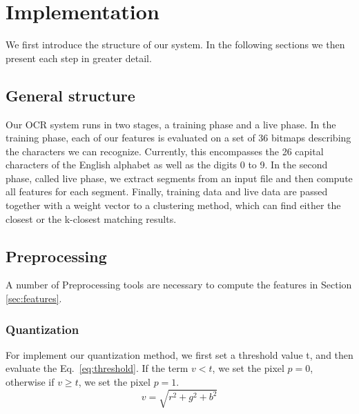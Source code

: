 \documentclass{article}
\begin{document}
\section{Implementation}
\label{sec:implementation}
We first introduce the structure of our system. In the following sections we then present each step in greater detail.

\subsection{General structure}
Our OCR system runs in two stages, a training phase and a live phase. In the training phase, each of our features is evaluated on a set of 36 bitmaps describing the characters we can recognize. Currently, this encompasses the 26 capital characters of the English alphabet as well as the digits 0 to 9. In the second phase, called live phase, we extract segments from an input file and then compute all features for each segment. Finally, training data and live data are passed together with a weight vector to a clustering method, which can find either the closest or the k-closest matching results.

\subsection{Preprocessing}
A number of Preprocessing tools are necessary to compute the features in Section \ref{sec:features}.

\subsubsection{Quantization}
For implement our quantization method, we first set a threshold value t, and then evaluate the Eq.~\ref{eq:threshold}. If the term $v < t$, we set the pixel $p = 0$, otherwise if $v \geq t$, we set the pixel $p = 1$.
\begin{equation}
v = \sqrt{r^2 + g^2 + b^2}
\label{eq:threshold}
\end{equation}
\end{document}
